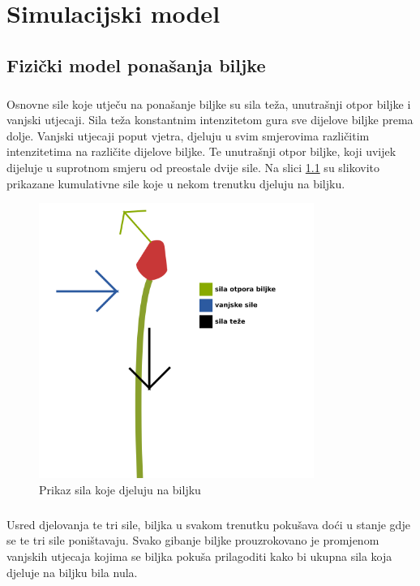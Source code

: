 \documentclass[times, utf8, diplomski]{fer}
\begin{document}
\chapter{Simulacijski model}
\section{Fizički model ponašanja biljke}
\paragraph{}
Osnovne sile koje utječu na ponašanje biljke su sila teža, unutrašnji otpor 
biljke i vanjski utjecaji. Sila teža konstantnim intenzitetom gura sve dijelove 
biljke prema dolje. Vanjski utjecaji poput vjetra, djeluju u svim smjerovima 
različitim intenzitetima na različite dijelove biljke. Te unutrašnji otpor 
biljke, koji uvijek dijeluje u suprotnom smjeru od preostale dvije sile. Na 
slici \ref{fig:31-1} su slikovito prikazane kumulativne sile koje u nekom 
trenutku djeluju na biljku.

\begin{figure}[h]
	\centering
	\includegraphics[width=0.8\textwidth]{img/31-1}
	\caption{Prikaz sila koje djeluju na biljku}
	\label{fig:31-1}
\end{figure}

\paragraph{}
Usred djelovanja te tri sile, biljka u svakom trenutku pokušava doći u stanje gdje se te tri sile poništavaju. Svako gibanje biljke prouzrokovano je promjenom vanjskih utjecaja kojima se biljka pokuša prilagoditi kako bi ukupna sila koja djeluje na biljku bila nula.
\end{document}
